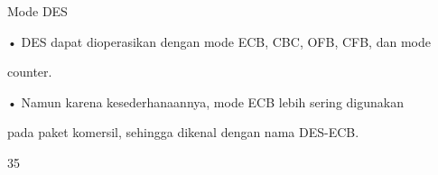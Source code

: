 \documentclass{article}
\begin{document}

Mode DES

• DES dapat dioperasikan dengan mode ECB, CBC, OFB, CFB, dan mode 

counter. 

• Namun karena kesederhanaannya, mode ECB lebih sering digunakan 

pada paket komersil, sehingga dikenal dengan nama DES-ECB.

35
\end{document}
